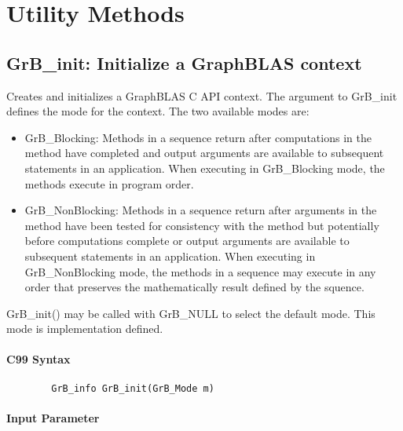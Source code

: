 \section{Utility Methods}


\subsection{{\sf GrB\_init}: Initialize a GraphBLAS context}

Creates and initializes a GraphBLAS C API context.  The argument
to {\sf GrB\_init} defines the mode for the context.  The two
available modes are:

\begin{itemize}
\item {\sf GrB\_Blocking}: Methods in a sequence return after
computations in the method have completed and output arguments
are available to subsequent statements in an application.  When
executing in {\sf GrB\_Blocking} mode, the methods execute 
in program order.

\item {\sf GrB\_NonBlocking}: Methods in a sequence return after
arguments in the method have been tested for consistency with the
method but potentially before computations complete or output 
arguments are available to subsequent statements in an application.
When executing in {\sf GrB\_NonBlocking} mode, the methods 
in a sequence may execute in any order that preserves the 
mathematically result defined by the squence.

\end{itemize}

{\sf GrB\_init()} may be called with {\sf GrB\_NULL} to select 
the default mode.  This mode is implementation defined.

\paragraph{C99 Syntax}

\begin{verbatim}
        GrB_info GrB_init(GrB_Mode m)
\end{verbatim}


\paragraph{Input Parameter}

